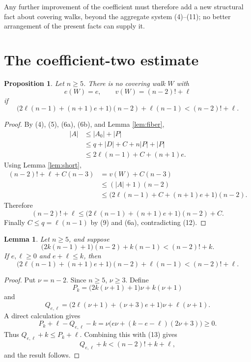 \documentclass[11pt]{article}
\newtheorem{lemma}[theorem]{Lemma}
\newtheorem{proposition}[theorem]{Proposition}
\begin{document}
Any further improvement of the coefficient must therefore add a new structural fact about
covering walks, beyond the aggregate system (4)--(11); no better arrangement of the present
facts can supply it.

\section{The coefficient-two estimate}

\begin{proposition}\label{prop:twoparam}
Let \(n\ge 5\).  There is no covering walk \(W\) with
\[
  e(W)=e,\qquad v(W)=(n-2)!+\ell
\]
if
\[
  \bigl(2\ell(n-1)+(n+1)e+1\bigr)(n-2)+\ell(n-1)<(n-2)!+\ell . \tag{12}
\]
\end{proposition}

\begin{proof}
By (4), (5), (6a), (6b), and Lemma \ref{lem:fiber},
\[
\begin{aligned}
  |A|
    &\le |A_0|+|P|\\
    &\le q+|D|+C+n|P|+|P|\\
    &\le 2\ell(n-1)+C+(n+1)e .
\end{aligned}
\]
Using Lemma \ref{lem:short},
\[
\begin{aligned}
  (n-2)!+\ell+C(n-3)
    &=v(W)+C(n-3)\\
    &\le (|A|+1)(n-2)\\
    &\le \bigl(2\ell(n-1)+C+(n+1)e+1\bigr)(n-2).
\end{aligned}
\]
Therefore
\[
  (n-2)!+\ell
    \le \bigl(2\ell(n-1)+(n+1)e+1\bigr)(n-2)+C.
\]
Finally \(C\le q=\ell(n-1)\) by (9) and (6a), contradicting (12).
\end{proof}

\begin{lemma}\label{lem:corner}
Let \(n\ge 5\), and suppose
\[
  \bigl(2k(n-1)+1\bigr)(n-2)+k(n-1)<(n-2)!+k . \tag{13}
\]
If \(e,\ell\ge 0\) and \(e+\ell\le k\), then
\[
  \bigl(2\ell(n-1)+(n+1)e+1\bigr)(n-2)+\ell(n-1)<(n-2)!+\ell .
\]
\end{lemma}

\begin{proof}
Put \(\nu=n-2\).  Since \(n\ge 5\), \(\nu\ge 3\).  Define
\[
  P_k=\bigl(2k(\nu+1)+1\bigr)\nu+k(\nu+1)
\]
and
\[
  Q_{e,\ell}=\bigl(2\ell(\nu+1)+(\nu+3)e+1\bigr)\nu+\ell(\nu+1).
\]
A direct calculation gives
\[
  P_k+\ell-Q_{e,\ell}-k
    =\nu\bigl(e\nu+(k-e-\ell)(2\nu+3)\bigr)\ge 0.
\]
Thus \(Q_{e,\ell}+k\le P_k+\ell\).  Combining this with (13) gives
\[
  Q_{e,\ell}+k<(n-2)!+k+\ell,
\]
and the result follows.
\end{proof}
\end{document}
